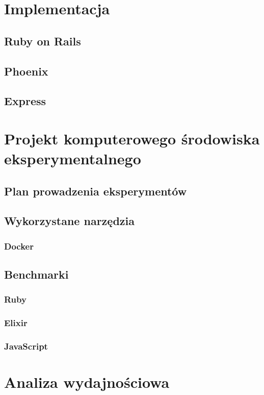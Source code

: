 \documentclass[mgr,oneside]{mgr}
\begin{document}
\chapter{Implementacja}
\section{Ruby on Rails}
\section{Phoenix}
\section{Express}

\chapter{Projekt komputerowego środowiska eksperymentalnego}
\section{Plan prowadzenia eksperymentów}

\section{Wykorzystane narzędzia}
\subsection{Docker}
\section{Benchmarki}
\subsection{Ruby}
\subsection{Elixir}
\subsection{JavaScript}

\chapter{Analiza wydajnościowa}
\label{cha:analiza_wydajnosciowa}
\end{document}
